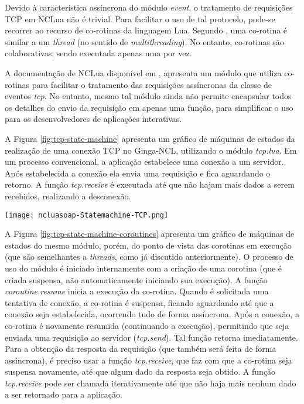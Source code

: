 Devido à característica assíncrona do módulo \textit{event}, o tratamento de requisições TCP em NCLua não é trivial. 
Para facilitar o uso de tal protocolo, pode-se recorrer ao recurso de co-rotinas da linguagem Lua. 
Segundo \cite{ierusalimschy2006programming}, uma co-rotina é similar a um \textit{thread} (no sentido de \textit{multithreading}).
No entanto, co-rotinas são colaborativas, sendo executada apenas uma por vez.

A documentação de NCLua disponível em \cite{doc-nclua}, apresenta um módulo que utiliza co-rotinas para facilitar 
o tratamento das requisições assíncronas da classe de eventos \textit{tcp}. No entanto, mesmo tal módulo ainda não
permite encapsular todos os detalhes do envio da requisição em apenas uma função, para simplificar 
o uso para os desenvolvedores de aplicações interativas.

A Figura \ref{fig:tcp-state-machine} apresenta um gráfico de máquinas de estados
da realização de uma conexão TCP no Ginga-NCL, utilizando o módulo \textit{tcp.lua}.
Em um processo convencional, a aplicação estabelece uma conexão
a um servidor. Após estabelecida a conexão ela envia uma requisição
e fica aguardando o retorno. A função \textit{tcp.receive} é executada até
que não hajam mais dados a serem recebidos, realizando
a desconexão.

\begin{center}
	\texttt{[image: ncluasoap-Statemachine-TCP.png]}
	\label{fig:tcp-state-machine}
\end{center}

A Figura \ref{fig:tcp-state-machine-coroutines} apresenta um gráfico de máquinas de estados
do mesmo módulo, porém, do ponto de vista das corotinas em execução (que são semelhantes
a \textit{threads}, como já discutido anteriormente). O processo de uso do módulo
é iniciado internamente com a criação de uma corotina (que é criada suspensa,
não automaticamente iniciando sua execução). A função \textit{coroutine.resume}
inicia a execução da co-rotina. Quando é solicitada uma tentativa de
conexão, a co-rotina é suspensa, ficando aguardando até que 
a conexão seja estabelecida, ocorrendo tudo de forma assíncrona.
Após a conexão, a co-rotina é novamente resumida (continuando a execução),
permitindo que seja enviada uma requisição ao servidor (\textit{tcp.send}).
Tal função retorna imediatamente. Para a obtenção da resposta
da requisição (que também será feita de forma assíncrona), 
é preciso usar a função \textit{tcp.receive}, que faz com que a co-rotina
seja suspensa novamente, até que algum dado da resposta seja obtido.
A função \textit{tcp.receive} pode ser chamada iterativamente até que
não haja mais nenhum dado a ser retornado para a aplicação.

